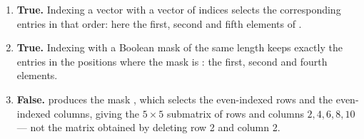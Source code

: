\documentclass[a4paper]{article}
\begin{document}
\begin{enumerate}[itemsep=8pt]
    \item \textbf{True.}
        Indexing a vector with a vector of indices selects the
        corresponding entries in that order: here the first, second and
        fifth elements of .

    \item \textbf{True.}
        Indexing with a Boolean mask of the same length keeps exactly the
        entries in the positions where the mask is : the
        first, second and fourth elements.

    \item \textbf{False.}
         produces the mask
        , which selects the
        even-indexed rows and the even-indexed columns, giving the $5 \times 5$
        submatrix of rows and columns $2, 4, 6, 8, 10$ --- not the matrix
        obtained by deleting row 2 and column 2.
\end{enumerate}
\fi
\end{document}
